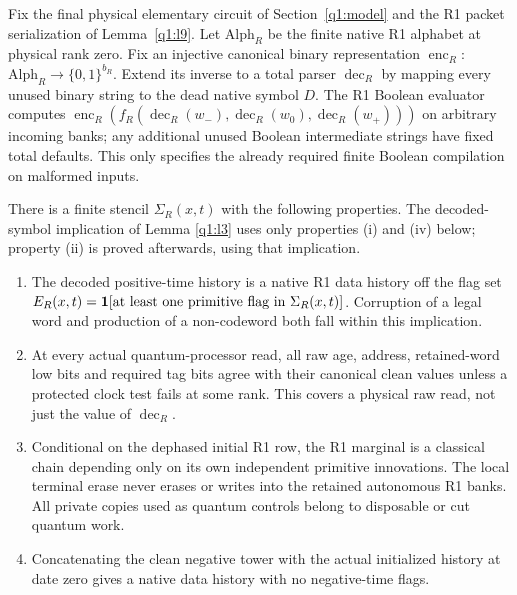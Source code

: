 \begin{lemma}\label{q1:l2}

Fix the final physical elementary circuit of Section~\ref{q1:model} and the R1 packet serialization of Lemma~\ref{q1:l9}. Let \(\mathrm{Alph}_{R}\) be the finite native R1 alphabet at physical rank zero. Fix an injective canonical binary representation \(\operatorname{enc}_{R}\):\(\mathrm{Alph}_{R} \to  \{0,1\}^{b_{R}}\). Extend its inverse to a total parser \(\operatorname{dec}_{R}\) by mapping every unused binary string to the dead native symbol \(D\). The R1 Boolean evaluator computes \(\operatorname{enc}_{R}(f_{R}(\operatorname{dec}_{R}(w_{-}),\operatorname{dec}_{R}(w_{0}),\operatorname{dec}_{R}(w_{+})))\) on arbitrary incoming banks; any additional unused Boolean intermediate strings have fixed total defaults. This only specifies the already required finite Boolean compilation on malformed inputs.

There is a finite stencil \(\Sigma_{R}(x,t)\) with the following properties. The decoded-symbol implication of Lemma \ref{q1:l3} uses only properties (i) and (iv) below; property (ii) is proved afterwards, using that implication.

\begin{enumerate}
\item The decoded positive-time history is a native R1 data history off the flag set \(E_{R}(x,t)=\mathbf 1[\text{at least one primitive flag in }\Sigma_{R}(x,t)]\). Corruption of a legal word and production of a non-codeword both fall within this implication.
\item At every actual quantum-processor read, all raw age, address, retained-word low bits and required tag bits agree with their canonical clean values unless a protected clock test fails at some rank. This covers a physical raw read, not just the value of \(\operatorname{dec}_{R}\).
\item Conditional on the dephased initial R1 row, the R1 marginal is a classical chain depending only on its own independent primitive innovations. The local terminal erase never erases or writes into the retained autonomous R1 banks. All private copies used as quantum controls belong to disposable or cut quantum work.
\item Concatenating the clean negative tower with the actual initialized history at date zero gives a native data history with no negative-time flags.
\end{enumerate}

\end{lemma}
